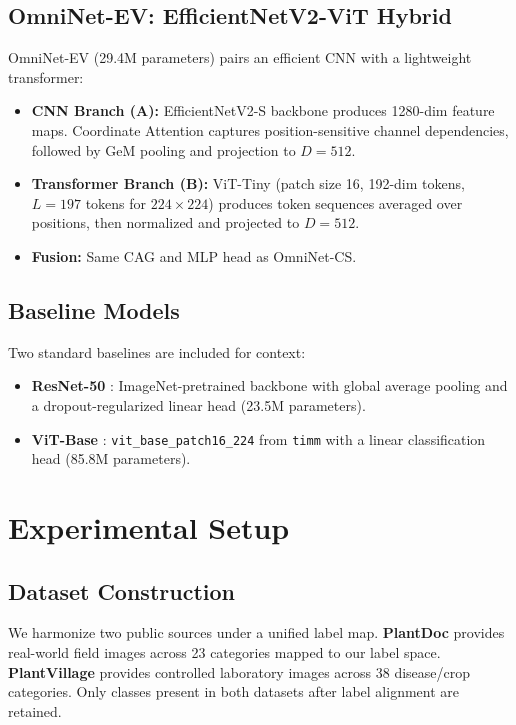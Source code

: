 \documentclass[conference]{IEEEtran}
\begin{document}
\subsection{OmniNet-EV: EfficientNetV2-ViT Hybrid}
OmniNet-EV (29.4M parameters) pairs an efficient CNN with a lightweight transformer:

\begin{itemize}
    \item \textbf{CNN Branch (A):} EfficientNetV2-S backbone produces 1280-dim feature maps. Coordinate Attention \cite{coordatt2021} captures position-sensitive channel dependencies, followed by GeM pooling and projection to $D=512$.
    \item \textbf{Transformer Branch (B):} ViT-Tiny (patch size 16, 192-dim tokens, $L=197$ tokens for $224\times224$) produces token sequences averaged over positions, then normalized and projected to $D=512$.
    \item \textbf{Fusion:} Same CAG and MLP head as OmniNet-CS.
\end{itemize}

\subsection{Baseline Models}
Two standard baselines are included for context:

\begin{itemize}
    \item \textbf{ResNet-50} \cite{resnet2016}: ImageNet-pretrained backbone with global average pooling and a dropout-regularized linear head (23.5M parameters).
    \item \textbf{ViT-Base} \cite{dosovitskiy2021}: \texttt{vit\_base\_patch16\_224} from \texttt{timm} \cite{rw2019timm} with a linear classification head (85.8M parameters).
\end{itemize}

\section{Experimental Setup}
\label{sec:exp}

\subsection{Dataset Construction}
We harmonize two public sources under a unified label map. \textbf{PlantDoc} \cite{plantdoc2020} provides real-world field images across 23 categories mapped to our label space. \textbf{PlantVillage} \cite{mohanty2016} provides controlled laboratory images across 38 disease/crop categories. Only classes present in both datasets after label alignment are retained.
\end{document}
